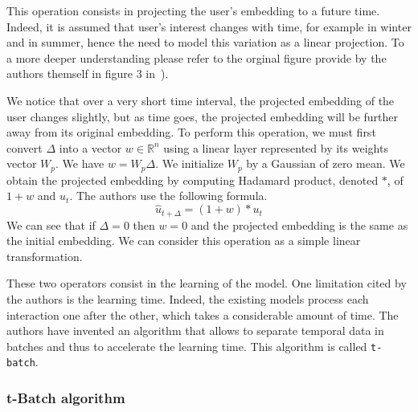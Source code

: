 This operation consists in projecting the user's embedding to a future time. Indeed, it is assumed that user's interest changes with time, for example in winter and in summer, hence the need to model this variation as a linear projection. To a more deeper understanding please refer to the orginal figure provide by the authors themself in figure 3 in~\cite{kumar2019predicting}).

We notice that over a very short time interval, the projected embedding of the user changes slightly, but as time goes, the projected embedding will be further away from its original embedding. To perform this operation, we must first convert $\Delta$ into a vector $w \in \mathbb{R}^n$ using a linear layer represented by its weights vector $W_p$. We have $w = W_p \Delta$. We initialize $W_p$ by a Gaussian of zero mean. We obtain the projected embedding by computing Hadamard product, denoted $*$, of $1+w$ and $u_t$. The authors use the following formula.
$$
\widehat u_{t+\Delta} = (1+w) * u_t
$$
We can see that if $\Delta = 0$ then $w=0$ and the projected embedding is the same as the initial embedding. We can consider this operation as a simple linear transformation.

These two operators consist in the learning of the model. One limitation cited by the authors is the learning time. Indeed, the existing models process each interaction one after the other, which takes a considerable amount of time. The authors have invented an algorithm that allows to separate temporal data in batches and thus to accelerate the learning time. This algorithm is called \texttt{t-batch}.

\subsubsection{t-Batch algorithm}




